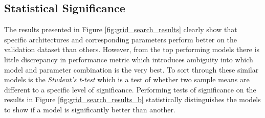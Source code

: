 \subsection{Statistical Significance}
The results presented in Figure \ref{fig:grid_search_results} clearly show that specific architectures and corresponding parameters perform better on the validation dataset than others. However, from the top performing models there is little discrepancy in performance metric which introduces ambiguity into which model and parameter combination is the very best. To sort through these similar models is the \textit{Student's t-test} which is a test of whether two sample means are different to a specific level of significance. Performing tests of significance on the results in Figure \ref{fig:grid_search_results_b} statistically distinguishes the models to show if a model is significantly better than another.

